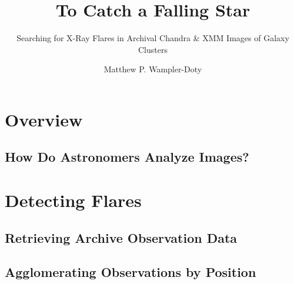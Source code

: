 \usepackage{graphicx}
\usepackage{hyperref}
\title{To Catch a Falling Star}
\subtitle{Searching for X-Ray Flares in Archival Chandra \& XMM Images of Galaxy Clusters}
\author{Matthew P. Wampler-Doty}
\date{}

\maketitle
{}
\section{Overview}
\subsection{How Do Astronomers Analyze Images?}
\section{Detecting Flares}
\subsection{Retrieving Archive Observation Data}
\subsection{Agglomerating Observations by Position}

